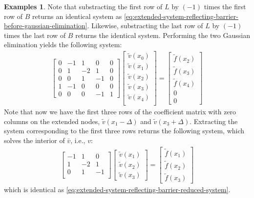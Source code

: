 \documentclass[11pt]{article}
\theoremstyle{definition}
\newtheorem{example}{Examples}[section]
\begin{document}
\begin{example}
	Note that substracting the first row of ${L}$ by $(-1)$ times the first row of $B$ returns an identical system as \eqref{eq:extended-system-reflecting-barrier-before-gaussian-elimination}. Likewise, substracting the last row of ${L}$ by $(-1)$ times the last row of $B$ returns the identical system. Performing the two Gaussian elimination yields the following system:
	\begin{align}\label{eq:extended-system-reflecting-barrier-after-gaussian-elimination}
	\begin{bmatrix}
	0 & -1 & 1 & 0 & 0 \\
	0 & 1 & -2 & 1 & 0 \\
	0 & 0 & 1 & -1 & 0 \\
	1 & -1  & 0 & 0 & 0 \\
	0 & 0 & 0 & -1 & 1
	\end{bmatrix} 	  \begin{bmatrix}
	\tilde{v}(x_0) \\
	\tilde{v}(x_1) \\
	\tilde{v}(x_2) \\
	\tilde{v}(x_3) \\
	\tilde{v}(x_4)  \\
	\end{bmatrix}
	=
	\begin{bmatrix}
	\tilde{f}(x_2) \\
	\tilde{f}(x_3) \\
	\tilde{f}(x_4) \\
	0 \\
	0
	\end{bmatrix}
	\end{align}
	Note that now we have the first three rows of the coefficient matrix with zero columns on the extended nodes, $\tilde{v}(x_1 - \Delta)$ and $\tilde{v}(x_3 + \Delta)$. Extracting the system corresponding to the first three rows returns the following system, which solves the interior of $\bar{v}$, i.e., $v$:
	\begin{align}
	\begin{bmatrix}
	-1 & 1 & 0  \\
	1 & -2 & 1 \\
	0 & 1 & -1 \\
	\end{bmatrix} 	  \begin{bmatrix}
	\tilde{v}(x_1) \\
	\tilde{v}(x_2) \\
	\tilde{v}(x_3)
	\end{bmatrix}
	=
	\begin{bmatrix}
	\tilde{f}(x_1) \\
	\tilde{f}(x_2) \\
	\tilde{f}(x_3)
	\end{bmatrix}
	\end{align}
	which is identical as  \eqref{eq:extended-system-reflecting-barrier-reduced-system}.
\end{example}
\end{document}
